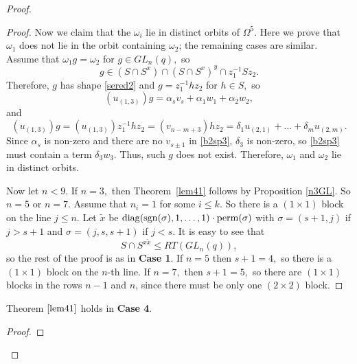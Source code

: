\begin{proof}
\begin{proof}
Now we claim that the $\omega_i$ lie in distinct orbits of $\Omega^5.$ Here we prove that $\omega_1$ does not lie in the orbit containing $\omega_2$; the   remaining cases are similar.  Assume that $\omega_1 g =\omega_2$ for $g \in GL_n(q),$ so 
$$g \in (S \cap S^x) \cap (S \cap S^x)^y \cap z_1^{-1}Sz_2.$$
Therefore, $g$ has shape \eqref{sered2} and $g=z_1^{-1}hz_2$ for $h \in S,$ so 
\begin{equation}\label{b2sp3}
(u_{(1,3)})g=\alpha_{s} v_{s} +\alpha_1 w_1+\alpha_2 w_2,
\end{equation}
and 
\begin{equation}\label{b2sp4}
(u_{(1,3)})g=(u_{(1,3)})z_1^{-1}hz_2=(v_{n-m+3})hz_2 = \delta_1 u_{(2,1)} + \ldots + \delta_m u_{(2,m)}.
\end{equation}
Since $\alpha_{s}$  is non-zero and there are no $v_{s \pm 1}$ in \eqref{b2sp3}, $\delta_3$ is non-zero, so \eqref{b2sp3}  must contain a term  $ \delta_3 w_3$. Thus, such $g$ does not exist. Therefore, $\omega_1$ and $\omega_2$ lie in  distinct orbits. 

Now let $n<9.$ If $n=3,$ then Theorem~\ref{lem41} follows by Proposition \ref{n3GL}. So $n=5$ or $n=7.$
Assume that $n_i=1$ for some $i\le k$. So there is a $(1\times 1)$ block on the line $j \le n$. Let $\tilde{x}$ be $\mathrm{diag}(\mathrm{sgn}(\sigma), 1, \ldots, 1) \cdot \mathrm{perm}(\sigma)$ with $\sigma=(s+1,j)$ if $j>s+1$ and $\sigma=(j,s,s+1)$ if $j<s.$ It is easy to see that 
$$S \cap S^{x \tilde x}\le RT(GL_n(q)),$$
so the rest of the proof is as in {\bf Case 1}. If $n=5$ then $s+1=4,$ so there is a $(1 \times 1)$ block on the $n$-th line. If $n=7,$ then  $s+1=5,$ so there are  $(1 \times 1)$ blocks in the rows $n-1$ and $n$, since there must be only one  $(2 \times 2)$ block.       
\end{proof}


\begin{Prop}
\label{case4prop}
 Theorem $\ref{lem41}$ holds in {\bf Case 4}.
\end{Prop}
\begin{proof}


\end{proof}
\end{proof}
